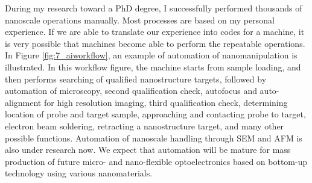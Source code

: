 During my research toward a PhD degree, I successfully performed thousands of nanoscale operations manually. Most processes are based on my personal experience.  
If we are able to translate our experience into codes for a machine, it is very possible that machines become able to perform the repeatable operations. In Figure \ref{fig:7_aiworkflow}, an example of automation of nanomanipulation is illustrated. In this workflow figure, the machine starts from sample loading, and then performs searching of qualified nanostructure targets, followed by automation of microscopy, second qualification check, autofocus and auto-alignment for high resolution imaging, third qualification check, determining location of probe and target sample, approaching and contacting probe to target, electron beam soldering, retracting a nanostructure target, and many other possible functions. 
Automation of nanoscale handling through SEM and AFM is also under research now. \cite{Fatikow1997Microsystem} We expect that automation will be mature for mass production of future micro- and nano-flexible optoelectronics based on bottom-up technology using various nanomaterials. 

